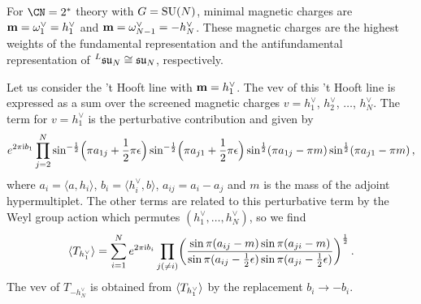 



For $\CN = 2^*$ theory with $G = \mathrm{SU}(N)$, minimal magnetic charges are
$\mathbf{m} = \omega^\vee_1 = h^\vee_1$ and
$\mathbf{m} = \omega^\vee_{N-1} = -h^\vee_N$.  These magnetic charges are the
highest weights of the fundamental representation and the
antifundamental representation of ${}^L\mathfrak{su}_N \cong \mathfrak{su}_N$,
respectively.

Let us consider the 't Hooft line with $\mathbf{m} = h^\vee_1$.  The vev
of this 't Hooft line is expressed as a sum over the screened magnetic
charges $v = h^\vee_1$, $h^\vee_2$, $\dotsc$, $h^\vee_N$.  The term
for $v = h^\vee_1$ is the perturbative contribution and given by
\begin{equation}
  e^{2\pi\mathrm{i} b_1}
  \prod_{j=2}^N
  \sin^{-\frac12}\Bigl(\pi a_{1j} + \frac12 \pi\epsilon\Bigr)
  \sin^{-\frac12}\Bigl(\pi a_{j1} + \frac12 \pi\epsilon\Bigr)
  \sin^{\frac12}(\pi a_{1j} - \pi m)
  \sin^{\frac12}(\pi a_{j1} - \pi m) \,,
\end{equation}
where $a_i = \langle a, h_i\rangle$,
$b_i = \langle h^\vee_i, b\rangle$, $a_{ij} = a_i - a_j$ and $m$ is
the mass of the adjoint hypermultiplet.  The other terms are related
to this perturbative term by the Weyl group action which permutes
$(h^\vee_1, \dotsc, h^\vee_N)$, so we find
\begin{equation}
  \langle T_{h^\vee_1} \rangle
  =
  \sum_{i=1}^N
  e^{2\pi\mathrm{i} b_i}
  \prod_{j (\neq i)}
  \biggl(
  \frac{\sin\pi(a_{ij} - m) \sin\pi(a_{ji} - m)}
        {\sin\pi(a_{ij} - \frac12\epsilon) \sin\pi(a_{ji} - \frac12\epsilon)}
  \biggr)^{\frac12} \,.
\end{equation}
The vev of $T_{-h^\vee_N}$ is obtained from $\langle T_{h^\vee_1} \rangle$ by
the replacement $b_i \to -b_i$.

